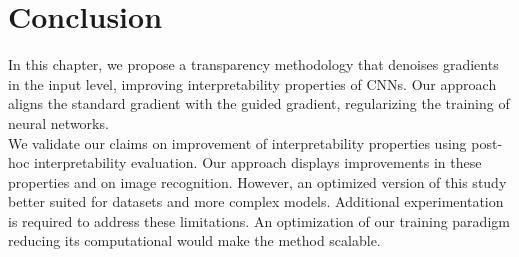 \section{Conclusion}
In this chapter, we propose a transparency methodology that denoises gradients in the input level, 
improving interpretability properties of CNNs. Our approach aligns the standard gradient with 
the guided gradient, regularizing the training of neural networks.\\

\noindent We validate our claims on improvement of interpretability properties using post-hoc 
interpretability evaluation. Our approach displays improvements in these properties and on image 
recognition. However, an optimized version of this study better suited for datasets 
and more complex models. Additional experimentation is required to address these 
limitations. An optimization of our training paradigm reducing its computational would make 
the method scalable.
